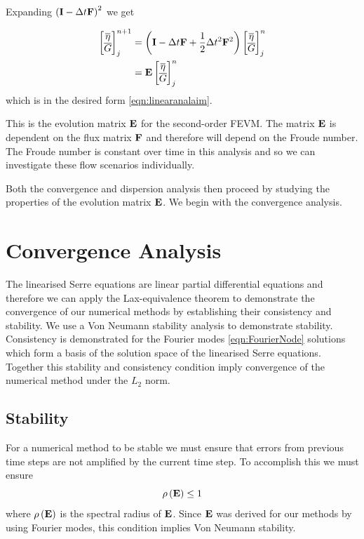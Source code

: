 Expanding $\left(\mathbf{I} - \Delta t\mathbf{F} \right)^2$ we get

\begin{align}
\begin{bmatrix}
\overline{\eta} \\ \overline{G}
\end{bmatrix}^{n+1}_j &= \left(\mathbf{I}  -\Delta t\mathbf{F} + \frac{1}{2}\Delta t^2\mathbf{F}^2 \right) \begin{bmatrix}
\overline{\eta} \\ \overline{G}
\end{bmatrix}^{n}_j \nonumber\\ &=  \mathbf{E}\begin{bmatrix}
\overline{\eta} \\ \overline{G}
\end{bmatrix}^{n}_j
\label{eqn:evolutionmatrix}
\end{align}
which is in the desired form \eqref{eqn:linearanalaim}.

This is the evolution matrix $\mathbf{E}$ for the second-order FEVM. The matrix $\mathbf{E}$ is dependent on the flux matrix $\mathbf{F}$ and therefore will depend on the Froude number. The Froude number is constant over time in this analysis and so we can investigate these flow scenarios individually.

Both the convergence and dispersion analysis then proceed by studying the properties of the evolution matrix $\mathbf{E}$. We begin with the convergence analysis.

\setcounter{subsection}{0}
\renewcommand{\thesubsection}{\thechapter.\arabic{section}.\arabic{subsection}} 

\section{Convergence Analysis}
The linearised Serre equations are linear partial differential equations and therefore we can apply the Lax-equivalence theorem to demonstrate the convergence of our numerical methods by establishing their consistency and stability. We use a Von Neumann stability analysis to demonstrate stability. Consistency is demonstrated for the Fourier modes \eqref{eqn:FourierNode} solutions which form a basis of the solution space of the linearised Serre equations. Together this stability and consistency condition imply convergence of the numerical method under the $L_2$ norm.

\subsection{Stability}
For a numerical method to be stable we must ensure that errors from previous time steps are not amplified by the current time step. To accomplish this we must ensure 
\begin{equation}
\rho\left(\mathbf{E} \right) \le 1
\label{eqn:stabilitycondition}
\end{equation}
where $\rho\left(\mathbf{E} \right)$ is the spectral radius of $\mathbf{E}$. Since $\mathbf{E}$ was derived for our methods by using Fourier modes, this condition implies Von Neumann stability. 

